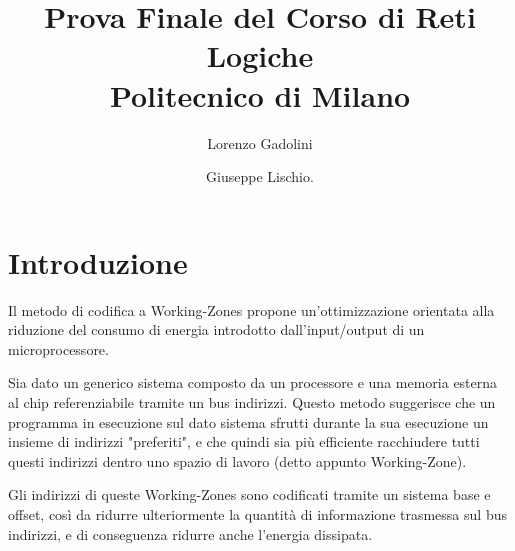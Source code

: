 \documentclass{article}
\begin{document}
\title{\Huge Prova Finale del Corso di Reti Logiche\\ \huge Politecnico di Milano}
\author{\Large Lorenzo Gadolini \and \Large Giuseppe Lischio.}
\date{}



\bigskip

\maketitle





\newpage

\tableofcontents





\newpage
{}




\setcounter{page}{1}


\section{Introduzione}
\begin{flushleft}
Il metodo di codifica a Working-Zones propone un'ottimizzazione orientata alla riduzione del consumo di energia introdotto dall'input/output di un microprocessore.

\medskip

Sia dato un generico sistema composto da un processore e una memoria esterna al chip referenziabile tramite un bus indirizzi. Questo metodo suggerisce che un programma in esecuzione sul dato sistema sfrutti durante la sua esecuzione un insieme di indirizzi "preferiti", e che quindi sia più efficiente racchiudere tutti questi indirizzi dentro uno spazio di lavoro (detto appunto Working-Zone). 

\medskip

Gli indirizzi di queste Working-Zones sono codificati tramite un sistema base e offset, così da ridurre ulteriormente la quantità di informazione trasmessa sul bus indirizzi, e di conseguenza ridurre anche l'energia dissipata.

\end{flushleft}

\bigskip
\end{document}
